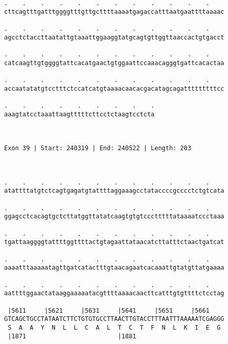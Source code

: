 \documentclass{article}
\begin{document}
\begin{Verbatim}
.    .    .    .    .    .    .    .    .    .    .    .    
cttcagtttgatttggggtttgttgcttttaaaatgagaccatttaatgaattttaaaac
                                                            
.    .    .    .    .    .    .    .    .    .    .    .    
agcctctaccttaatattgtaaattggaaggtatgcagtgttggttaaccactgtgacct
                                                            
.    .    .    .    .    .    .    .    .    .    .    .    
catcaagttgtggggtattcacatgaactgtggaattccaaacagggtgattcacactaa
                                                            
.    .    .    .    .    .    .    .    .    .    .    .    
accaatatatgtcctttctccatcatgtaaaacaacacgacatagcagatttttttttcc
                                                            
.    .    .    .    .    .    .    .    .
aaagtatcctaaattaagtttttcttcctctaagtcctcta
                                         
                                         
 
Exon 39 | Start: 240319 | End: 240522 | Length: 203



.    .    .    .    .    .    .    .    .    .    .    .    
atattttatgtctcagtgagatgtattttaggaaagcctataccccgcccctctgtcata
                                                            
.    .    .    .    .    .    .    .    .    .    .    .    
ggagcctcacagtgctcttatggttatatcaagtgtgtccctttttataaaatccctaaa
                                                            
.    .    .    .    .    .    .    .    .    .    .    .    
tgattaaggggtattttggttttactgtagaattataacatcttatttctaactgatcat
                                                            
.    .    .    .    .    .    .    .    .    .    .    .    
aaaatttaaaaatagttgatcatactttgtaacagaatcacaaattgtatgttatgaaaa
                                                            
.    .    .    .    .    .    .    .    .    .    .    .    
aattttggaactataaggaaaaatacgttttaaaacaacttcatttgtgttttctcctag
                                                            
 |5611     |5621     |5631     |5641     |5651     |5661    
GTCAGCTGCCTATAATCTTCTGTGTGCCTTAACTTGTACCTTTAATTTAAAAATCGAGGG
 S  A  A  Y  N  L  L  C  A  L  T  C  T  F  N  L  K  I  E  G 
 |1871                         |1881                        
  

\end{Verbatim}
\end{document}
